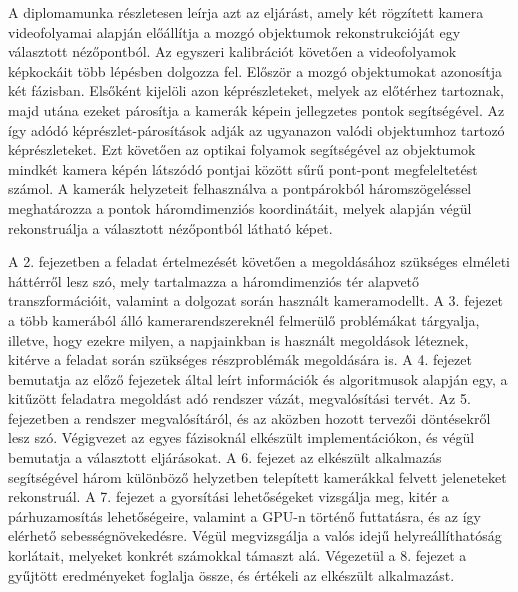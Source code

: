 A diplomamunka részletesen leírja azt az eljárást, amely két rögzített kamera videofolyamai alapján előállítja a mozgó objektumok rekonstrukcióját egy választott nézőpontból. Az egyszeri kalibrációt követően a videofolyamok képkockáit több lépésben dolgozza fel. Először a mozgó objektumokat azonosítja két fázisban. Elsőként kijelöli azon képrészleteket, melyek az előtérhez tartoznak, majd utána ezeket párosítja a kamerák képein jellegzetes pontok segítségével. Az így adódó képrészlet-párosítások adják az ugyanazon valódi objektumhoz tartozó képrészleteket. Ezt követően az optikai folyamok segítségével az objektumok mindkét kamera képén látszódó pontjai között sűrű pont-pont megfeleltetést számol. A kamerák helyzeteit felhasználva a pontpárokból háromszögeléssel meghatározza a pontok háromdimenziós koordinátáit, melyek alapján végül rekonstruálja a választott nézőpontból látható képet.

A 2. fejezetben a feladat értelmezését követően a megoldásához szükséges elméleti háttérről lesz szó, mely tartalmazza a háromdimenziós tér alapvető transzformációit, valamint a dolgozat során használt kameramodellt. A 3. fejezet a több kamerából álló kamerarendszereknél felmerülő problémákat tárgyalja, illetve, hogy ezekre milyen, a napjainkban is használt megoldások léteznek, kitérve a feladat során szükséges részproblémák megoldására is. A 4. fejezet bemutatja az előző fejezetek által leírt információk és algoritmusok alapján egy, a kitűzött feladatra megoldást adó rendszer vázát, megvalósítási tervét. Az 5. fejezetben a rendszer megvalósítáról, és az aközben hozott tervezői döntésekről lesz szó. Végigvezet az egyes fázisoknál elkészült implementációkon, és végül bemutatja a választott eljárásokat. A 6. fejezet az elkészült alkalmazás segítségével három különböző helyzetben telepített kamerákkal felvett jeleneteket rekonstruál. A 7. fejezet a gyorsítási lehetőségeket vizsgálja meg, kitér a párhuzamosítás lehetőségeire, valamint a GPU-n történő futtatásra, és az így elérhető sebességnövekedésre. Végül megvizsgálja a valós idejű helyreállíthatóság korlátait, melyeket konkrét számokkal támaszt alá. Végezetül a 8. fejezet a gyűjtött eredményeket foglalja össze, és értékeli az elkészült alkalmazást.
